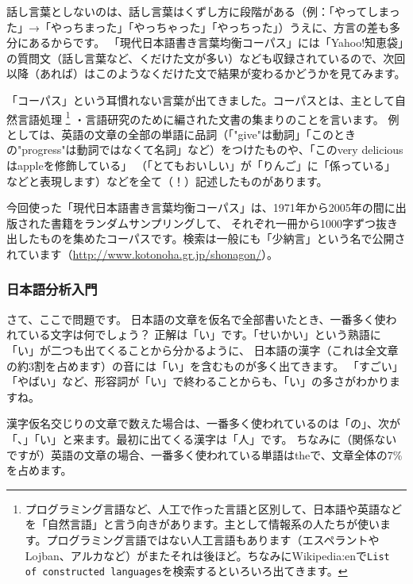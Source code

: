 \begin{center}
\begin{minipage}{0.85\hsize}
\vspace{1zw}
{\footnotesize
話し言葉としないのは、話し言葉はくずし方に段階がある（例：「やってしまった」→「やっちまった」「やっちゃった」「やっちった」）うえに、方言の差も多分にあるからです。
「現代日本語書き言葉均衡コーパス」には「Yahoo!知恵袋」の質問文（話し言葉など、くだけた文が多い）なども収録されているので、次回以降（あれば）はこのようなくだけた文で結果が変わるかどうかを見てみます。
}
\vspace{1zw}
\end{minipage}
\end{center}

「コーパス」という耳慣れない言葉が出てきました。コーパスとは、主として自然言語処理%
\footnote{プログラミング言語など、人工で作った言語と区別して、日本語や英語などを「自然言語」と言う向きがあります。主として情報系の人たちが使います。プログラミング言語ではない人工言語もあります（エスペラントやLojban、アルカなど）がまたそれは後ほど。ちなみにWikipedia:enで{\tt List of constructed languages}を検索するといろいろ出てきます。}%
・言語研究のために編された文書の集まりのことを言います。
例としては、英語の文章の全部の単語に品詞（「"give"は動詞」「このときの"progress"は動詞ではなくて名詞」など）をつけたものや、「このvery deliciousはappleを修飾している」%
（「とてもおいしい」が「りんご」に「係っている」などと表現します）などを全て（！）記述したものがあります。

今回使った「現代日本語書き言葉均衡コーパス」は、1971年から2005年の間に出版された書籍をランダムサンプリングして、
それぞれ一冊から1000字ずつ抜き出したものを集めたコーパスです。検索は一般にも「少納言」という名で公開されています（\url{http://www.kotonoha.gr.jp/shonagon/}）。

\subsubsection*{日本語分析入門}

さて、ここで問題です。
日本語の文章を仮名で全部書いたとき、一番多く使われている文字は何でしょう？
正解は「い」です。「せいかい」という熟語に「い」が二つも出てくることから分かるように、
日本語の漢字（これは全文章の約3割を占めます）の音には「い」を含むものが多く出てきます。
「すごい」「やばい」など、形容詞が「い」で終わることからも、「い」の多さがわかりますね。

\begin{center}
\begin{minipage}{0.85\hsize}
\vspace{1zw}
{\footnotesize
漢字仮名交じりの文章で数えた場合は、一番多く使われているのは「の」、次が「、」「い」と来ます。最初に出てくる漢字は「人」です。
ちなみに（関係ないですが）英語の文章の場合、一番多く使われている単語はtheで、文章全体の7\%を占めます。
}
\vspace{1zw}
\end{minipage}
\end{center}

